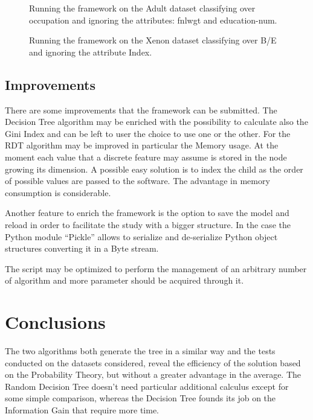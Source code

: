 \documentclass{acm_proc_article-sp-sigmod07}
\begin{document}
\begin{figure}
\label{fig:adult-occupation}
\centering
{}
\caption{Running the framework on the Adult dataset classifying over
occupation and ignoring the attributes: fnlwgt and education-num.}
\end{figure}

\begin{figure*}
\label{fig:training_st_standard}
\centering
{}
\caption{Running the framework on the Xenon dataset classifying over B/E
and ignoring the attribute Index.}
\end{figure*}

\subsection{Improvements}
There are some improvements that the framework can be submitted.
The Decision Tree algorithm may be enriched with the possibility to
calculate also the Gini Index and can be left to user the choice to use 
one or the other. 
For the RDT algorithm may be improved in particular the Memory usage. At
the moment each value that a discrete feature may assume is stored in the
node growing its dimension. A possible easy solution is to index the child
as the order of possible values are passed to the software. The advantage
in memory consumption is considerable.

Another feature to enrich the framework is the option to save the model
and reload in order to facilitate the study with a bigger structure. In
the case the Python module ``Pickle'' allows to serialize and de-serialize
Python object structures converting it in a Byte stream.

The script may be optimized to perform the management of an arbitrary
number of algorithm and more parameter should be acquired through it.

\section{Conclusions}
The two algorithms both generate the tree in a similar way and the tests
conducted on the datasets considered, reveal the efficiency of the solution
based on the Probability Theory, but without a greater advantage in the
average. The Random Decision Tree doesn't need particular additional
calculus except for some simple comparison, whereas the Decision Tree
founds its job on the Information Gain that require more time.
\end{document}
